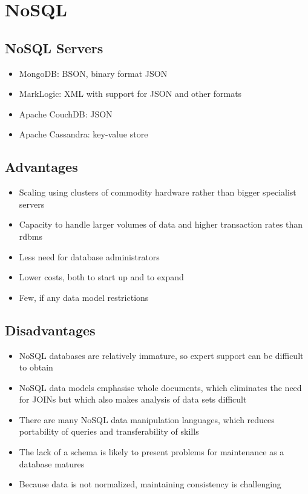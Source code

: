 \documentclass[10pt]{article}
\begin{document}
  \section*{NoSQL}
    \subsection*{NoSQL Servers}
      \begin{itemize}
        \item MongoDB: BSON, binary format JSON
        \item MarkLogic: XML with support for JSON and other formats
        \item Apache CouchDB: JSON
        \item Apache Cassandra: key-value store
      \end{itemize}

    \subsection*{Advantages}
      \begin{itemize}
        \item Scaling using clusters of commodity hardware rather than bigger specialist servers
        \item Capacity to handle larger volumes of data and higher transaction rates than rdbms
        \item Less need for database administrators
        \item Lower costs, both to start up and to expand
        \item Few, if any data model restrictions
      \end{itemize}

      \subsection*{Disadvantages}
        \begin{itemize}
          \item NoSQL databases are relatively immature, so expert support can be difficult to obtain
          \item NoSQL data models emphasise whole documents, which eliminates the need for JOINs but which also makes analysis of data sets difficult
          \item There are many NoSQL data manipulation languages, which reduces portability of queries and transferability of skills
          \item The lack of a schema is likely to present problems for maintenance as a database matures
          \item Because data is not normalized, maintaining consistency is challenging
        \end{itemize}
    
\end{document}
